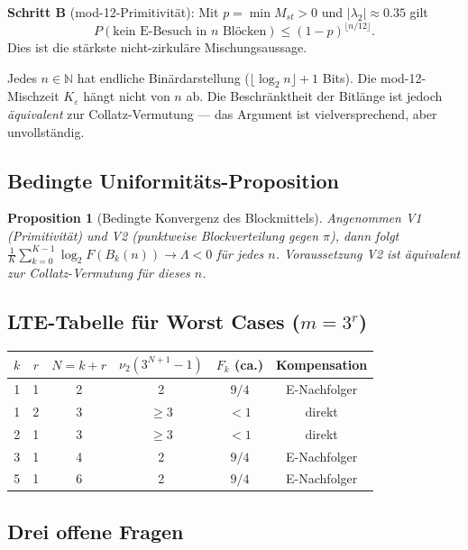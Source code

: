 \documentclass[12pt,a4paper]{article}
\newtheorem{proposition}[satz]{Proposition}
\newcommand{\vii}{\nu_2}
\newcommand{\N}{\mathbb{N}}
\newcommand{\Lam}{\Lambda}
\begin{document}
\textbf{Schritt B} (mod-12-Primitivität): Mit $p=\min M_{st}>0$ und
$|\lambda_2|\approx 0.35$ gilt
\[
  P(\text{kein E-Besuch in }n\text{ Blöcken})\leq (1-p)^{\lfloor n/12\rfloor}.
\]
Dies ist die stärkste nicht-zirkuläre Mischungsaussage.

\begin{tcolorbox}[offen,title={Schritt C: Binärinformation (bedingt)}]
Jedes $n \in \N$ hat endliche Binärdarstellung ($\lfloor\log_2 n\rfloor+1$
Bits). Die mod-12-Mischzeit $K_\varepsilon$ hängt nicht von $n$ ab.
Die Beschränktheit der Bitlänge ist jedoch \emph{äquivalent} zur
Collatz-Vermutung --- das Argument ist vielversprechend, aber unvollständig.
\end{tcolorbox}

\subsection{Bedingte Uniformitäts-Proposition}

\begin{proposition}[Bedingte Konvergenz des Blockmittels]
Angenommen V1 (Primitivität) und V2 (punktweise Blockverteilung gegen $\pi$),
dann folgt $\frac{1}{K}\sum_{k=0}^{K-1}\log_2 F(B_k(n))\to\Lam<0$ für jedes
$n$. Voraussetzung V2 ist äquivalent zur Collatz-Vermutung für dieses $n$.
\end{proposition}

\subsection{LTE-Tabelle für Worst Cases ($m=3^r$)}

\begin{center}
\small
\begin{tabular}{cccccc}
\toprule
$k$ & $r$ & $N=k+r$ & $\vii(3^{N+1}-1)$ & $F_k$ (ca.) & Kompensation \\
\midrule
1 & 1 & 2 & 2 & $9/4$ & E-Nachfolger \\
1 & 2 & 3 & $\geq 3$ & $<1$ & direkt \\
2 & 1 & 3 & $\geq 3$ & $<1$ & direkt \\
3 & 1 & 4 & 2 & $9/4$ & E-Nachfolger \\
5 & 1 & 6 & 2 & $9/4$ & E-Nachfolger \\
\bottomrule
\end{tabular}
\end{center}

\subsection{Drei offene Fragen}
\end{document}
